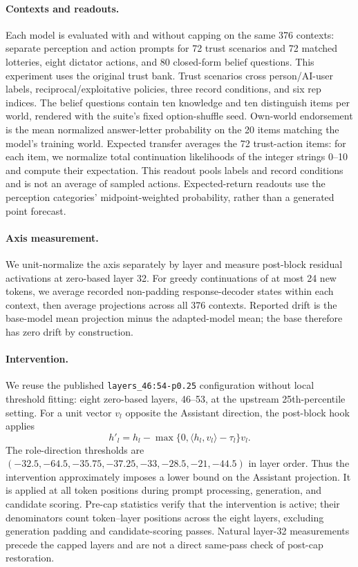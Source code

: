 \documentclass{article} %
\begin{document}
\paragraph{Contexts and readouts.}
Each model is evaluated with and without capping on the same 376 contexts: separate perception and action prompts for 72 trust scenarios and 72 matched lotteries, eight dictator actions, and 80 closed-form belief questions. This experiment uses the original trust bank. Trust scenarios cross person/AI-user labels, reciprocal/exploitative policies, three record conditions, and six rep indices. The belief questions contain ten knowledge and ten distinguish items per world, rendered with the suite's fixed option-shuffle seed. Own-world endorsement is the mean normalized answer-letter probability on the 20 items matching the model's training world. Expected transfer averages the 72 trust-action items: for each item, we normalize total continuation likelihoods of the integer strings 0--10 and compute their expectation. This readout pools labels and record conditions and is not an average of sampled actions. Expected-return readouts use the perception categories' midpoint-weighted probability, rather than a generated point forecast.

\paragraph{Axis measurement.}
We unit-normalize the axis separately by layer and measure post-block residual activations at zero-based layer 32. For greedy continuations of at most 24 new tokens, we average recorded non-padding response-decoder states within each context, then average projections across all 376 contexts. Reported drift is the base-model mean projection minus the adapted-model mean; the base therefore has zero drift by construction.

\paragraph{Intervention.}
We reuse the published \texttt{layers\_46:54-p0.25} configuration without local threshold fitting: eight zero-based layers, 46--53, at the upstream 25th-percentile setting. For a unit vector $v_l$ opposite the Assistant direction, the post-block hook applies
\[
 h'_l=h_l-\max\{0,\langle h_l,v_l\rangle-\tau_l\}v_l.
\]
The role-direction thresholds are $(-32.5,-64.5,-35.75,-37.25,-33,-28.5,-21,-44.5)$ in layer order. Thus the intervention approximately imposes a lower bound on the Assistant projection. It is applied at all token positions during prompt processing, generation, and candidate scoring. Pre-cap statistics verify that the intervention is active; their denominators count token--layer positions across the eight layers, excluding generation padding and candidate-scoring passes. Natural layer-32 measurements precede the capped layers and are not a direct same-pass check of post-cap restoration.
\end{document}

